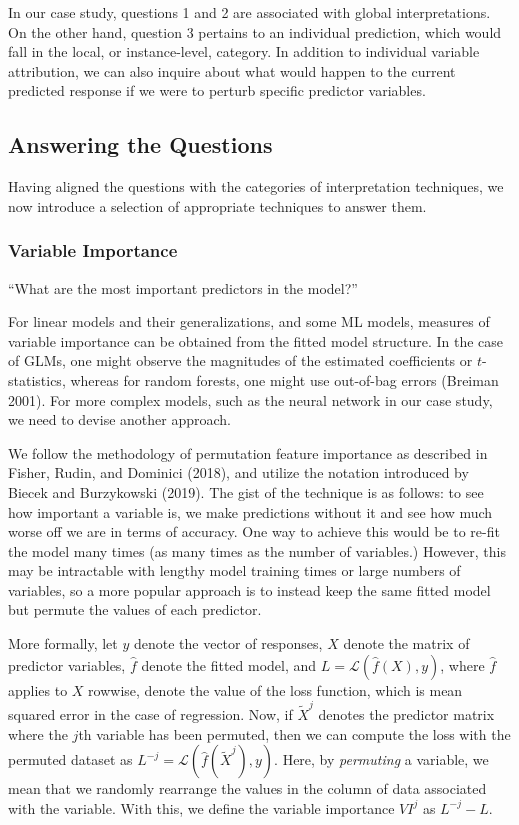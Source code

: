 \documentclass[preprint, 3p, twocolumn, letterpaper, 10pt]{elsarticle} %
\begin{document}
In our case study, questions 1 and 2 are
associated with global interpretations. On the other hand, question 3 pertains to an
individual prediction, which would fall in the local, or instance-level,
category. In addition to individual variable attribution, we can also inquire
about what would happen to the current predicted response if we were to perturb
specific predictor variables.

\hypertarget{answering-the-questions}{%
\subsection{Answering the Questions}\label{answering-the-questions}}

Having aligned the questions with the categories of interpretation techniques,
we now introduce a selection of appropriate techniques to answer them.

\hypertarget{variable-importance}{%
\subsubsection{Variable Importance}\label{variable-importance}}

``What are the most important predictors in the model?''

For linear models and their generalizations, and some ML models, measures of
variable importance can be obtained from the fitted model structure. In the
case of GLMs, one might observe the magnitudes of the estimated coefficients or
\(t\)-statistics, whereas
for random forests, one might use out-of-bag errors (Breiman 2001).
For more complex models, such as the neural network in our case study, we need
to devise another approach.

We follow the methodology of permutation feature importance as described in
Fisher, Rudin, and Dominici (2018), and utilize the notation introduced by Biecek and Burzykowski (2019).
The gist of the technique is as follows: to see how important a variable is,
we make predictions without it and see how much worse off we are in terms of
accuracy. One way to achieve this would be to re-fit the model many times (as
many times as the number of variables.) However, this may be intractable with
lengthy model training times or large numbers of variables, so a more popular
approach is to instead keep the same fitted model but permute the values of each
predictor.

More formally, let \(y\) denote the vector of responses, \(X\) denote the matrix of
predictor variables, \(\widehat{f}\) denote the fitted model, and
\(L = \mathcal{L}(\widehat{f}(X), y)\), where \(\widehat{f}\) applies to \(X\)
rowwise, denote the value of the loss function, which is mean squared error
in the case of regression. Now, if \(\widetilde{X}^{j}\) denotes the predictor
matrix where the \(j\)th variable has been permuted, then we can compute the
loss with the permuted dataset as
\(L^{-j} = \mathcal{L}(\widehat{f}(\widetilde{X}^{j}), y)\).
Here, by \emph{permuting} a variable, we mean that we randomly rearrange the values
in the column of data associated with the variable.
With this, we define
the variable importance \(VI^{j}\) as \(L^{-j} - L\).
\end{document}
